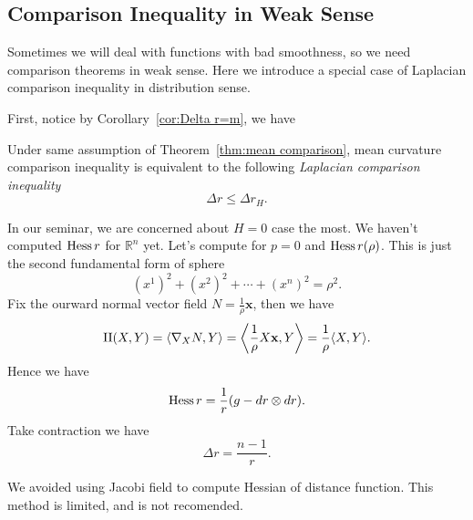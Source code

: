 \subsection{Comparison Inequality in Weak Sense}

Sometimes we will deal with functions with bad smoothness, so we need comparison theorems in weak sense.
Here we introduce a special case of Laplacian comparison inequality in distribution sense.

First, notice by Corollary~\ref{cor:Delta r=m}, we have
\begin{prop}
    Under same assumption of Theorem~\ref{thm:mean comparison}, mean curvature comparison inequality is equivalent to the following \emph{Laplacian comparison inequality}
    \[\Delta r\leq\Delta r_H.\]
\end{prop}

\begin{eg}
    In our seminar, we are concerned about $H=0$ case the most.
    We haven't computed $\operatorname{Hess}{r}$ for $\mathbb{R}^n$ yet.
    Let's compute for $p=0$ and $\operatorname{Hess}{r}(\rho)$.
    This is just the second fundamental form of sphere
    \[(x^1)^2+(x^2)^2+\cdots+(x^n)^2=\rho^2.\]
    Fix the ourward normal vector field $N=\frac{1}{\rho}\mathbf{x}$, then we have
    \[\operatorname{II}(X,Y)=\langle\nabla_XN,Y\rangle=\left\langle\frac{1}{\rho}X\mathbf{x},Y\right\rangle=\frac{1}{\rho}\langle X,Y\rangle.\]
    Hence we have
    \[\operatorname{Hess}{r}=\frac{1}{r}(g-dr\otimes dr).\]
    Take contraction we have
    \[\Delta r=\frac{n-1}{r}.\]

    We avoided using Jacobi field to compute Hessian of distance function.
    This method is limited, and is not recomended.
\end{eg}

